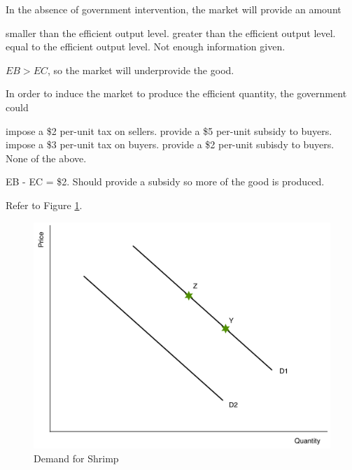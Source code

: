 \documentclass[addpoints,11pt]{exam}
\theoremstyle{definition}
\begin{document}
\begin{questions}
	
\question \label{q8} In the absence of government intervention, the market will provide an amount

\begin{choices}
	\CorrectChoice smaller than the efficient output level.
	\choice greater than the efficient output level.
	\choice equal to the efficient output level.
	\choice Not enough information given.
\end{choices}

\begin{solution}
	$EB > EC$, so the market will underprovide the good.
\end{solution}

\question \label{q9} In order to induce the market to produce the efficient quantity, the government could 

\begin{choices}
	\choice impose a \$2 per-unit tax on sellers.
	\choice provide a \$5 per-unit subsidy to buyers. 
	\choice impose a \$3 per-unit tax on buyers.
	\CorrectChoice provide a \$2 per-unit subisdy to buyers.
	\choice None of the above.
\end{choices}

\begin{solution}
	EB - EC = \$2. Should provide a subsidy so more of the good is produced.
\end{solution}
	
	\question Refer to Figure \ref{MC2}.


\begin{figure}[H]
	\centering
	\includegraphics[scale=.35]{Exam1_MC2.pdf}
	\caption{Demand for Shrimp}
	\label{MC2}
\end{figure}
	

\end{questions}
\end{document}
